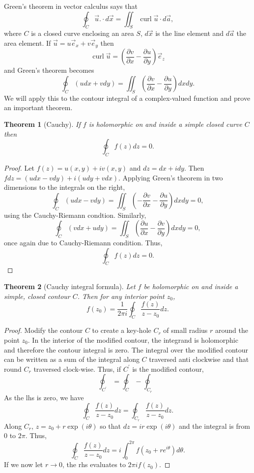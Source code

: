 \documentclass{article}
\theoremstyle{plain}
\newtheorem{thm}{Theorem}
\numberwithin{thm}{section}
\theoremstyle{plain}
\numberwithin{prop}{section}
\theoremstyle{plain}
\numberwithin{prop}{section}
\theoremstyle{definition}
\numberwithin{defn}{section}
\theoremstyle{remark}
\numberwithin{equation}{section}
\newcommand{\op}{\prime}
\DeclareMathOperator{\curl}{curl}
\begin{document}
Green's theorem in vector calculus says that
\[
\oint_C \vec{u}.\cdot d\vec{x} = \iint_S \curl\vec{u}\cdot d\vec{a},
\]
where $C$ is a closed curve enclosing an area $S$, $d\vec{x}$ is the line 
element and $d\vec{a}$ the area element. If $\vec{u} = u\vec{e}_x + v\vec{e}_y$
then 
\[
\curl\vec{u} = \left(\frac{\partial v}{\partial x} - 
\frac{\partial u}{\partial y}\right)\vec{e}_z
\]
and Green's theorem becomes
\[
\oint_C (udx + vdy) = \iint_S\left(\frac{\partial v}{\partial x} - 
\frac{\partial u}{\partial y}\right)dxdy.
\]
We will apply this to the contour integral of a complex-valued function and
prove an important theorem.
\begin{thm}[Cauchy]\label{s4t1}
If $f$ is holomorphic on and inside a simple closed curve $C$ then
\[
\oint_C f(z)dz = 0.
\]
\end{thm}
\begin{proof}
Let $f(z) = u(x, y) + iv(x, y)$ and $dz = dx + idy$. Then $fdz = (udx - vdy) +
i(udy + vdx)$. Applying Green's theorem in two dimensions to the integrals on 
the right,
\[
\oint_C (udx - vdy) = \iint_S\left(-\frac{\partial v}{\partial x} - 
\frac{\partial u}{\partial y}\right)dxdy = 0,
\]
using the Cauchy-Riemann condtion. Similarly,
\[
\oint_C (vdx + udy) = \iint_S\left(\frac{\partial u}{\partial x} - 
\frac{\partial v}{\partial y}\right)dxdy = 0,
\]
once again due to Cauchy-Riemann condition. Thus,
\[
\oint_C f(z)dz = 0.
\]
\end{proof}

\begin{thm}[Cauchy integral formula]\label{s4t2}
Let $f$ be holomorphic on and inside a simple, closed contour $C$. Then for any
interior point $z_0$,
\[
f(z_0) = \frac{1}{2\pi i}\oint_C \frac{f(z)}{z - z_0}dz.
\]
\end{thm}
\begin{proof}
Modify the contour $C$ to create a key-hole $C_r$ of small radius $r$ around the 
point $z_0$. In the interior of the modified contour, the integrand is 
holomorphic and therefore the contour integral is zero. The integral over the
modified contour can be written as a sum of the integral along $C$ traversed
anti clockwise and that round $C_r$ traversed clock-wise. Thus, if $C^\op$ is
the modified contour,
\[
\oint_{C^\op} = \oint_C - \oint_{C_r}
\]
As the lhs is zero, we have
\[
\oint_C \frac{f(z)}{z - z_0}dz = \oint_{C_r}\frac{f(z)}{z - z_0}dz.
\]
Along $C_r$, $z = z_0 + r\exp(i\theta)$ so that $dz = ir\exp(i\theta)$ and
the integral is from $0$ to $2\pi$. Thus,
\[
\oint_C \frac{f(z)}{z - z_0}dz = i\int_0^{2\pi}f(z_0 + re^{i\theta})d\theta.
\]
If we now let $r \rightarrow 0$, the rhs evaluates to $2\pi if(z_0)$.
\end{proof}
\end{document}
